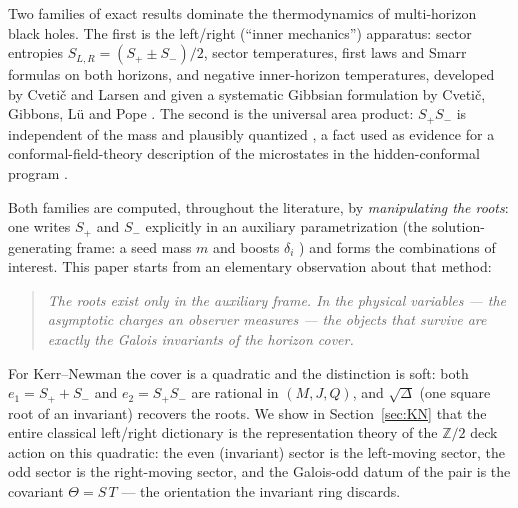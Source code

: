 \documentclass[11pt]{article}
\theoremstyle{definition}
\theoremstyle{remark}
\newcommand{\ZZ}{\mathbb{Z}}
\newcommand{\disc}{\Delta}
\begin{document}
Two families of exact results dominate the thermodynamics of multi-horizon
black holes. The first is the left/right (``inner mechanics'') apparatus: sector
entropies $S_{L,R}=(S_+\pm S_-)/2$, sector temperatures, first laws and Smarr
formulas on both horizons, and negative inner-horizon temperatures, developed
by Cveti\v{c} and Larsen \cite{CL1,CL2} and given a systematic Gibbsian
formulation by Cveti\v{c}, Gibbons, L\"u and Pope \cite{CGLP2018}. The second
is the universal area product: $S_+S_-$ is independent of the mass and
plausibly quantized \cite{AH,CGP2011,CR2012}, a fact used as evidence for a
conformal-field-theory description of the microstates in the hidden-conformal
program \cite{CMS,WangLiu,ChenLong4Q}.

Both families are computed, throughout the literature, by \emph{manipulating
the roots}: one writes $S_+$ and $S_-$ explicitly in an auxiliary
parametrization (the solution-generating frame: a seed mass $m$ and boosts
$\delta_i$ \cite{CY,Std4Q}) and forms the combinations of interest. This paper
starts from an elementary observation about that method:

\begin{quote}
\emph{The roots exist only in the auxiliary frame. In the physical variables
--- the asymptotic charges an observer measures --- the objects that survive
are exactly the Galois invariants of the horizon cover.}
\end{quote}

For Kerr--Newman the cover is a quadratic and the distinction is soft: both
$e_1=S_++S_-$ and $e_2=S_+S_-$ are rational in $(M,J,Q)$, and $\sqrt{\disc}$
(one square root of an invariant) recovers the roots. We show in
Section~\ref{sec:KN} that the entire classical left/right dictionary is the
representation theory of the $\ZZ/2$ deck action on this quadratic: the even
(invariant) sector is the left-moving sector, the odd sector is the
right-moving sector, and the Galois-odd datum of the pair is the covariant
$\Theta=S\,T$ --- the orientation the invariant ring discards.
\end{document}
